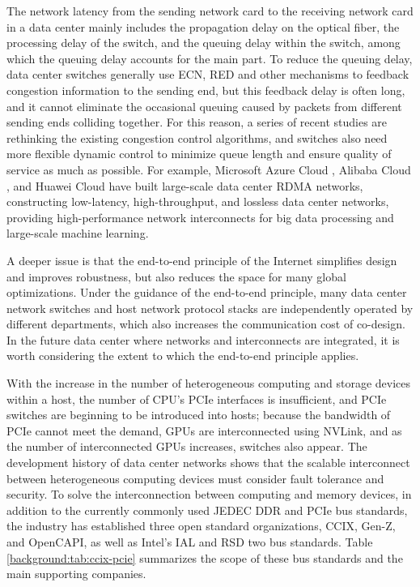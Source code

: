 The network latency from the sending network card to the receiving network card in a data center mainly includes the propagation delay on the optical fiber, the processing delay of the switch, and the queuing delay within the switch, among which the queuing delay accounts for the main part. To reduce the queuing delay, data center switches generally use ECN, RED and other mechanisms to feedback congestion information to the sending end, but this feedback delay is often long, and it cannot eliminate the occasional queuing caused by packets from different sending ends colliding together. For this reason, a series of recent studies are rethinking the existing congestion control algorithms, and switches also need more flexible dynamic control to minimize queue length and ensure quality of service as much as possible. For example, Microsoft Azure Cloud \cite{guo2016rdma}, Alibaba Cloud \cite{aliyun-rdma}, and Huawei Cloud \cite{huawei-lossless} have built large-scale data center RDMA networks, constructing low-latency, high-throughput, and lossless data center networks, providing high-performance network interconnects for big data processing and large-scale machine learning.

A deeper issue is that the end-to-end principle of the Internet simplifies design and improves robustness, but also reduces the space for many global optimizations. Under the guidance of the end-to-end principle, many data center network switches and host network protocol stacks are independently operated by different departments, which also increases the communication cost of co-design. In the future data center where networks and interconnects are integrated, it is worth considering the extent to which the end-to-end principle applies.

With the increase in the number of heterogeneous computing and storage devices within a host, the number of CPU's PCIe interfaces is insufficient, and PCIe switches are beginning to be introduced into hosts; because the bandwidth of PCIe cannot meet the demand, GPUs are interconnected using NVLink, and as the number of interconnected GPUs increases, switches also appear. The development history of data center networks shows that the scalable interconnect between heterogeneous computing devices must consider fault tolerance and security. To solve the interconnection between computing and memory devices, in addition to the currently commonly used JEDEC DDR and PCIe bus standards, the industry has established three open standard organizations, CCIX, Gen-Z, and OpenCAPI, as well as Intel's IAL and RSD two bus standards. Table \ref{background:tab:ccix-pcie} summarizes the scope of these bus standards and the main supporting companies.

